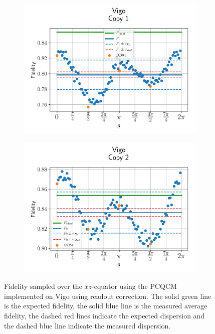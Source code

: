  
  \begin{figure}[H]
    \centering
    \begin{subfigure}{.5\textwidth}
      \centering
      \includegraphics[width=\textwidth]{Figures/PhaseCovariant/IBM/OnlyEquator/results_vigo_copy1.png}
      \label{fig:pc_uncorrected_vigo_equator_1}
    \end{subfigure}%
    \begin{subfigure}{.5\textwidth}
      \centering
      \includegraphics[width=\textwidth]{Figures/PhaseCovariant/IBM/OnlyEquator/results_vigo_copy2.png}
      \label{fig:pc_uncorrected_vigo_equator_2}
    \end{subfigure}
    \vspace{-0.5cm}
    \caption{Fidelity sampled over the $xz$-equator using the PCQCM implemented on Vigo using readout correction. The solid green line is the expected fidelity, the solid blue line is the measured average fidelity, the dashed red lines indicate the expected dispersion and the dashed blue line indicate the measured dispersion.}
    \label{fig:pc_uncorrected_vigo_equator}
  \end{figure}
  

